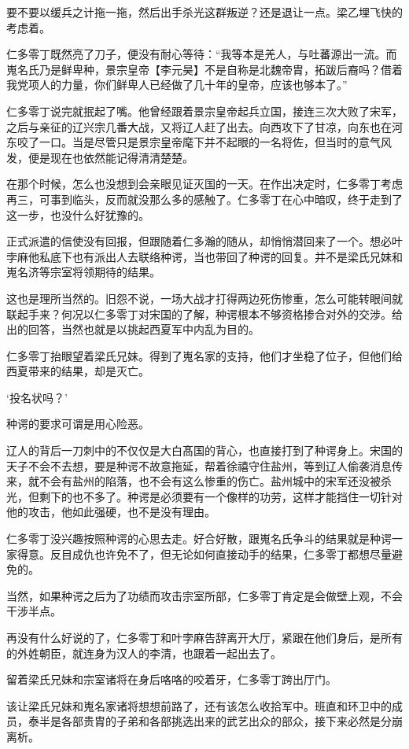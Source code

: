 要不要以缓兵之计拖一拖，然后出手杀光这群叛逆？还是退让一点。梁乙埋飞快的考虑着。

仁多零丁既然亮了刀子，便没有耐心等待：“我等本是羌人，与吐蕃源出一流。而嵬名氏乃是鲜卑种，景宗皇帝【李元昊】不是自称是北魏帝胄，拓跋后裔吗？借着我党项人的力量，你们鲜卑人已经做了几十年的皇帝，应该也够本了。”

仁多零丁说完就抿起了嘴。他曾经跟着景宗皇帝起兵立国，接连三次大败了宋军，之后与亲征的辽兴宗几番大战，又将辽人赶了出去。向西攻下了甘凉，向东也在河东咬了一口。当是尽管只是景宗皇帝麾下并不起眼的一名将佐，但当时的意气风发，便是现在也依然能记得清清楚楚。

在那个时候，怎么也没想到会亲眼见证灭国的一天。在作出决定时，仁多零丁考虑再三，可事到临头，反而就没那么多的感触了。仁多零丁在心中暗叹，终于走到了这一步，也没什么好犹豫的。

正式派遣的信使没有回报，但跟随着仁多瀚的随从，却悄悄潜回来了一个。想必叶孛麻他私底下也有派出人去联络种谔，当也带回了种谔的回复。并不是梁氏兄妹和嵬名济等宗室将领期待的结果。

这也是理所当然的。旧怨不说，一场大战才打得两边死伤惨重，怎么可能转眼间就联起手来？何况以仁多零丁对宋国的了解，种谔根本不够资格掺合对外的交涉。给出的回答，当然也就是以挑起西夏军中内乱为目的。

仁多零丁抬眼望着梁氏兄妹。得到了嵬名家的支持，他们才坐稳了位子，但他们给西夏带来的结果，却是灭亡。

‘投名状吗？’

种谔的要求可谓是用心险恶。

辽人的背后一刀刺中的不仅仅是大白髙国的背心，也直接打到了种谔身上。宋国的天子不会不去想，要是种谔不故意拖延，帮着徐禧守住盐州，等到辽人偷袭消息传来，就不会有盐州的陷落，也不会有这么惨重的伤亡。盐州城中的宋军还没被杀光，但剩下的也不多了。种谔是必须要有一个像样的功劳，这样才能挡住一切针对他的攻击，他如此强硬，也不是没有理由。

仁多零丁没兴趣按照种谔的心思去走。好合好散，跟嵬名氏争斗的结果就是种谔一家得意。反目成仇也许免不了，但无论如何直接动手的结果，仁多零丁都想尽量避免的。

当然，如果种谔之后为了功绩而攻击宗室所部，仁多零丁肯定是会做壁上观，不会干涉半点。

再没有什么好说的了，仁多零丁和叶孛麻告辞离开大厅，紧跟在他们身后，是所有的外姓朝臣，就连身为汉人的李清，也跟着一起出去了。

留着梁氏兄妹和宗室诸将在身后咯咯的咬着牙，仁多零丁跨出厅门。

该让梁氏兄妹和嵬名家诸将想想前路了，还有该怎么收拾军中。班直和环卫中的成员，泰半是各部贵胄的子弟和各部挑选出来的武艺出众的部众，接下来必然是分崩离析。

